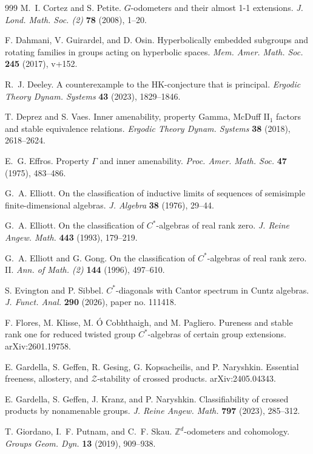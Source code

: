 \documentclass[11pt,a4,leqno]{amsart}
\theoremstyle{definition}
\theoremstyle{remark}
\numberwithin{equation}{section}
\theoremstyle{plain}
\newcommand{\Zb}{\mathbb{Z}}
\begin{document}
\begin{thebibliography}{999}
M.~I. Cortez and S. Petite.
$G$-odometers and their almost 1-1 extensions.
{\it J. Lond. Math. Soc. (2)} {\bf 78} (2008), 1--20. 

F. Dahmani, V. Guirardel, and D. Osin.
Hyperbolically embedded subgroups and rotating families in groups acting on hyperbolic spaces.
{\it Mem. Amer. Math. Soc.} {\bf 245} (2017), v+152.

R.~J. Deeley.
A counterexample to the HK-conjecture that is principal. 
{\it Ergodic Theory Dynam. Systems} {\bf 43} (2023), 1829--1846.

T. Deprez and S. Vaes.
Inner amenability, property Gamma, McDuff $\mathrm{II}_1$ factors and stable equivalence relations. 
{\it Ergodic Theory Dynam. Systems} {\bf 38} (2018), 2618--2624.

E.~G. Effros.
Property ${\Gamma}$ and inner amenability.
{\it Proc. Amer. Math. Soc.} {\bf 47} (1975), 483--486.

G.~A. Elliott.
On the classification of inductive limits of sequences of semisimple finite-dimensional algebras.
{\it J. Algebra} {\bf 38} (1976), 29--44. 

G.~A. Elliott.
On the classification of $C^*$-algebras of real rank zero.
{\it J. Reine Angew. Math.} {\bf 443} (1993), 179--219.

G.~A. Elliott and G. Gong.
On the classification of $C^*$-algebras of real rank zero. II.
{\it Ann. of Math. (2)} {\bf 144} (1996), 497--610. 

S. Evington and P. Sibbel.
$C^*$-diagonals with Cantor spectrum in Cuntz algebras.
{\it J. Funct. Anal.} {\bf 290} (2026), paper no. 111418. 
 
F. Flores, M. Klisse, M. \'{O} Cobhthaigh, and M. Pagliero.
Pureness and stable rank one for reduced twisted group $C^*$-algebras of certain group extensions. 
arXiv:2601.19758.

E. Gardella, S. Geffen, R. Gesing, G. Kopsacheilis, and P. Naryshkin.
Essential freeness, allostery, and $\mathcal{Z}$-stability of crossed products.
arXiv:2405.04343.

E. Gardella, S. Geffen, J. Kranz, and P. Naryshkin.
Classifiability of crossed products by nonamenable groups.
{\it J. Reine Angew. Math.} {\bf 797} (2023), 285--312.

T. Giordano, I.~F. Putnam, and C.~F. Skau.
$\Zb^d$-odometers and cohomology.
{\it Groups Geom. Dyn.} {\bf 13} (2019), 909--938.


\end{thebibliography}
\end{document}
